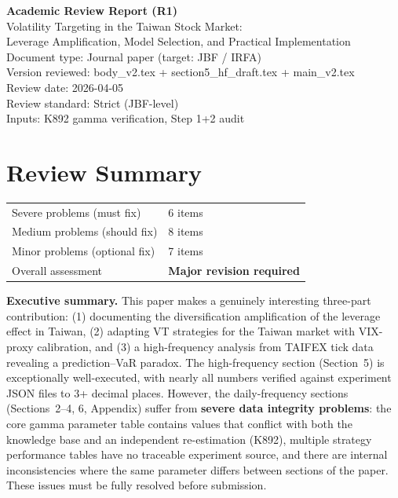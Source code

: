 \documentclass[12pt,a4paper]{article}
\begin{document}
\begin{center}
{\Large\bfseries Academic Review Report (R1)}\\[0.5em]
{\large Volatility Targeting in the Taiwan Stock Market:\\Leverage Amplification, Model Selection, and Practical Implementation}\\[0.5em]
{\normalsize Document type: Journal paper (target: JBF / IRFA)}\\
{\normalsize Version reviewed: body\_v2.tex + section5\_hf\_draft.tex + main\_v2.tex}\\
{\normalsize Review date: 2026-04-05}\\
{\normalsize Review standard: Strict (JBF-level)}\\
{\normalsize Inputs: K892 gamma verification, Step 1+2 audit}
\end{center}

\bigskip

\section*{Review Summary}

\begin{tabular}{ll}
\textcolor{errorred}{Severe problems (must fix)} & 6 items \\
\textcolor{warncolor}{Medium problems (should fix)} & 8 items \\
Minor problems (optional fix) & 7 items \\
Overall assessment & \textbf{Major revision required} \\
\end{tabular}

\bigskip

\noindent\textbf{Executive summary.} This paper makes a genuinely interesting three-part contribution: (1) documenting the diversification amplification of the leverage effect in Taiwan, (2) adapting VT strategies for the Taiwan market with VIX-proxy calibration, and (3) a high-frequency analysis from TAIFEX tick data revealing a prediction--VaR paradox. The high-frequency section (Section~5) is exceptionally well-executed, with nearly all numbers verified against experiment JSON files to 3+ decimal places. However, the daily-frequency sections (Sections~2--4, 6, Appendix) suffer from \textbf{severe data integrity problems}: the core gamma parameter table contains values that conflict with both the knowledge base and an independent re-estimation (K892), multiple strategy performance tables have no traceable experiment source, and there are internal inconsistencies where the same parameter differs between sections of the paper. These issues must be fully resolved before submission.
\end{document}

